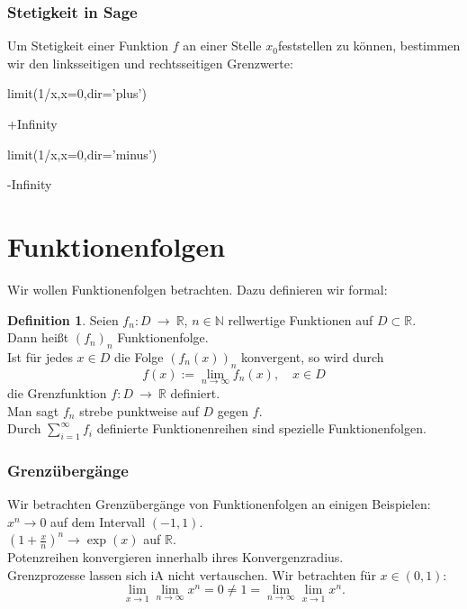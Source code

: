 \documentclass[fontsize=12pt,paper=a4,twoside,bibtotoc,idxtotoc,
liststotoc,pagesize,BCOR1.2cm,DIV15,chapterprefix,pagesize=pdftex]{scrbook}
\theoremstyle{plain}
\theoremstyle{definition}
\newtheorem{df}[equation]{Definition}
\theoremstyle{remark}
\begin{document}
\subsubsection{Stetigkeit in Sage}
Um Stetigkeit einer Funktion $f$ an einer Stelle $x_0$feststellen zu können, bestimmen wir den linksseitigen und rechtsseitigen Grenzwerte:
\begin{sagein}
limit(1/x,x=0,dir='plus') 
\end{sagein}
\begin{sage}
 +Infinity
\end{sage}
\begin{sagein}
 limit(1/x,x=0,dir='minus')
\end{sagein}
\begin{sage}
 -Infinity
\end{sage}

\section{Funktionenfolgen}
Wir wollen Funktionenfolgen betrachten. Dazu definieren wir formal:
\begin{df}
Seien $f_n: D \ \rightarrow \ \mathbb{R}$, $n \in
\mathbb{N}$  rellwertige Funktionen auf  $D \subset \mathbb{R}$.\\
Dann heißt  $(f_n)_n$ Funktionenfolge.\\
Ist für jedes $x\in D$ die Folge $(f_n(x))_n$ konvergent, so wird durch 
\[ f(x):= \lim_{n \rightarrow \infty} f_n(x), \quad x \in D \]
die Grenzfunktion $f:D \ \rightarrow \ \mathbb{R}$ definiert.\\
Man sagt $f_n$ strebe punktweise auf $D$ gegen $f$.\\  
Durch $\sum_{i=1}^\infty f_i$ definierte Funktionenreihen
sind spezielle Funktionenfolgen.
\end{df}  

\subsubsection{Grenzübergänge}
Wir betrachten Grenzübergänge von Funktionenfolgen an einigen Beispielen:
$x^n \rightarrow 0$ auf dem Intervall $(-1,1)$.\\
$\left( 1+ \frac{x}{n} \right)^n \rightarrow \exp(x)$ auf $\mathbb{R}$.\\
Potenzreihen konvergieren innerhalb ihres Konvergenzradius.\\
Grenzprozesse lassen sich iA nicht vertauschen. Wir betrachten für $x \in (0,1)$:
\[ \lim_{x \rightarrow 1} \lim_{n \rightarrow \infty} x^n =0 \neq 1 = 
  \lim_{n \rightarrow \infty} \lim_{x \rightarrow 1} x^n.\]  
\end{document}

